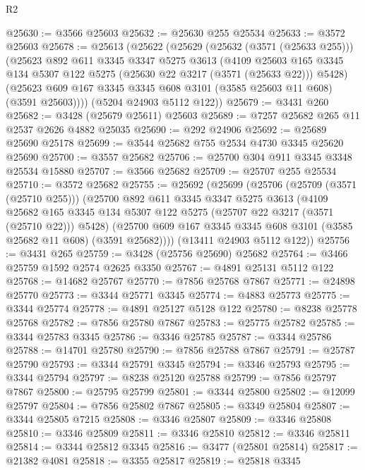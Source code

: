 \begin{lexlean}{R2}
\begin{coremodule}
@25630 := @3566 @25603
@25632 := @25630 @255 @25534
@25633 := @3572 @25603
@25678 := @25613
    (@25622
      (@25629
        (@25632 (@3571 (@25633 @255)))
        (@25623
          @892
          @611
          @3345
          @3347
          @5275
          @3613
          (@4109
            @25603
            @165
            @3345
            @134
            @5307
            @122
            @5275
            (@25630 @22 @3217 (@3571 (@25633 @22)))
            @5428)
          (@25623 @609 @167 @3345 @3345 @608 @3101 (@3585 @25603 @11 @608) (@3591 @25603))))
      (@5204 @24903 @5112 @122))
@25679 := @3431 @260
@25682 := @3428 (@25679 @25611) @25603
@25689 := @7257 @25682 @265 @11 @2537 @2626 @4882 @25035
@25690 := @292 @24906
@25692 := @25689 @25690 @25178
@25699 := @3544 @25682 @755 @2534 @4730 @3345 @25620 @25690
@25700 := @3557 @25682
@25706 := @25700 @304 @911 @3345 @3348 @25534 @15880
@25707 := @3566 @25682
@25709 := @25707 @255 @25534
@25710 := @3572 @25682
@25755 := @25692
    (@25699
      (@25706
        (@25709 (@3571 (@25710 @255)))
        (@25700
          @892
          @611
          @3345
          @3347
          @5275
          @3613
          (@4109
            @25682
            @165
            @3345
            @134
            @5307
            @122
            @5275
            (@25707 @22 @3217 (@3571 (@25710 @22)))
            @5428)
          (@25700 @609 @167 @3345 @3345 @608 @3101 (@3585 @25682 @11 @608) (@3591 @25682))))
      (@13411 @24903 @5112 @122))
@25756 := @3431 @265
@25759 := @3428 (@25756 @25690) @25682
@25764 := @3466 @25759 @1592 @2574 @2625 @3350
@25767 := @4891 @25131 @5112 @122
@25768 := @14682 @25767
@25770 := @7856 @25768 @7867
@25771 := @24898 @25770
@25773 := @3344 @25771 @3345
@25774 := @4883 @25773
@25775 := @3344 @25774
@25778 := @4891 @25127 @5128 @122
@25780 := @8238 @25778 @25768
@25782 := @7856 @25780 @7867
@25783 := @25775 @25782
@25785 := @3344 @25783 @3345
@25786 := @3346 @25785
@25787 := @3344 @25786
@25788 := @14701 @25780
@25790 := @7856 @25788 @7867
@25791 := @25787 @25790
@25793 := @3344 @25791 @3345
@25794 := @3346 @25793
@25795 := @3344 @25794
@25797 := @8238 @25120 @25788
@25799 := @7856 @25797 @7867
@25800 := @25795 @25799
@25801 := @3344 @25800
@25802 := @12099 @25797
@25804 := @7856 @25802 @7867
@25805 := @3349 @25804
@25807 := @3344 @25805 @7215
@25808 := @3346 @25807
@25809 := @3346 @25808
@25810 := @3346 @25809
@25811 := @3346 @25810
@25812 := @3346 @25811
@25814 := @3344 @25812 @3345
@25816 := @3477 (@25801 @25814)
@25817 := @21382 @4081
@25818 := @3355 @25817
@25819 := @25818 @3345

\end{coremodule}
\end{lexlean}
